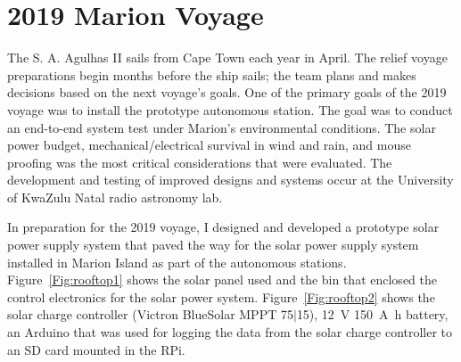 \section{2019 Marion Voyage}

The S. A. Agulhas II sails from Cape Town each year in April. The relief voyage preparations begin months before the ship sails; the team plans and makes decisions based on the next voyage's goals. One of the primary goals of the 2019 voyage was to install the prototype autonomous station.   The goal was to conduct an end-to-end system test under Marion's environmental conditions. The solar power budget, mechanical/electrical survival in wind and rain, and mouse proofing was the most critical considerations that were evaluated. The development and testing of improved designs and systems occur at the University of KwaZulu Natal radio astronomy lab. 

In preparation for the 2019 voyage, I designed and developed a prototype solar power supply system that paved the way for the solar power supply system installed in Marion Island as part of the autonomous stations. Figure~\ref{Fig:rooftop1} shows the solar panel used and the bin that enclosed the control electronics for the solar power system. Figure~\ref{Fig:rooftop2} shows the solar charge controller (Victron BlueSolar MPPT 75$\vert$15), \SI{12}{\volt} \SI{150}{\ampere \hour} battery, an Arduino that was used for logging the data from the solar charge controller to an SD card mounted in the RPi. 

